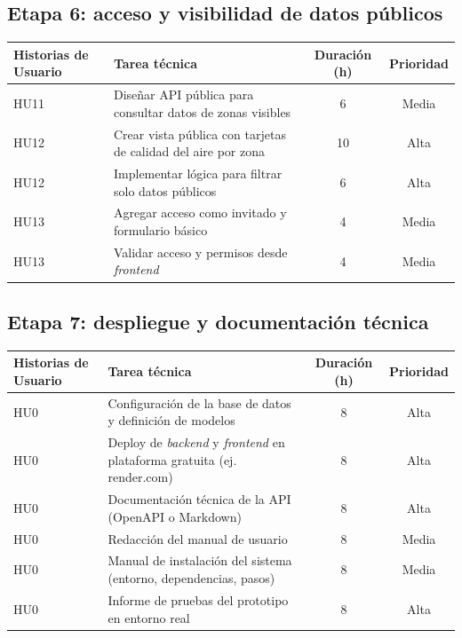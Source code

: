 \documentclass[
11pt, %
]{charter}
\begin{document}
\subsection*{Etapa 6: acceso y visibilidad de datos públicos}
\begin{tabular}{|p{2.5cm}|p{7.5cm}|c|c|}
\hline
\textbf{Historias de Usuario} & \textbf{Tarea técnica} & \textbf{Duración (h)} & \textbf{Prioridad} \\
\hline
HU11 & Diseñar API pública para consultar datos de zonas visibles & 6 & Media \\
\hline
HU12 & Crear vista pública con tarjetas de calidad del aire por zona & 10 & Alta \\
\hline
HU12 & Implementar lógica para filtrar solo datos públicos & 6 & Alta \\
\hline
HU13 & Agregar acceso como invitado y formulario básico & 4 & Media \\
\hline
HU13 & Validar acceso y permisos desde \textit{frontend} & 4 & Media \\
\hline
\end{tabular}

\subsection*{Etapa 7: despliegue y documentación técnica}
\begin{tabular}{|p{2.5cm}|p{7.5cm}|c|c|}
\hline
\textbf{Historias de Usuario} & \textbf{Tarea técnica} & \textbf{Duración (h)} & \textbf{Prioridad} \\
\hline
HU0 & Configuración de la base de datos y definición de modelos & 8 & Alta \\
\hline
HU0 & Deploy de \textit{backend} y \textit{frontend} en plataforma gratuita (ej. render.com) & 8 & Alta \\
\hline
HU0 & Documentación técnica de la API (OpenAPI o Markdown) & 8 & Alta \\
\hline
HU0 & Redacción del manual de usuario & 8 & Media \\
\hline
HU0 & Manual de instalación del sistema (entorno, dependencias, pasos) & 8 & Media \\
\hline
HU0 & Informe de pruebas del prototipo en entorno real & 8 & Alta \\
\hline
\end{tabular}
\end{document}
